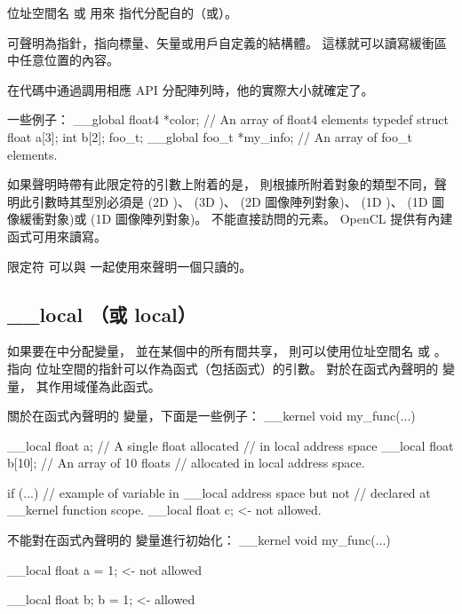位址空間名  或  用來
指代分配自的（或）。

 可聲明為指針，指向標量、矢量或用戶自定義的結構體。
這樣就可以讀寫緩衝區中任意位置的內容。

在代碼中通過調用相應 API 分配陣列時，他的實際大小就確定了。

一些例子：
\startclc
__global float4	*color;		// An array of float4 elements
typedef struct {
	float	a[3];
	int	b[2];
} foo_t;
__global foo_t	*my_info;	// An array of foo_t elements.
\stopclc

如果聲明時帶有此限定符的引數上附着的是，
則根據所附着對象的類型不同，聲明此引數時其型別必須是
  (2D )、  (3D )、
  (2D 圖像陣列對象)、  (1D )、
  (1D 圖像緩衝對象)或  (1D 圖像陣列對象)。
不能直接訪問的元素。 OpenCL 提供有內建函式可用來讀寫。

限定符  可以與  一起使用來聲明一個只讀的。

\subsection{__local （或 local）}

如果要在中分配變量，
並在某個中的所有間共享，
則可以使用位址空間名  或 。
指向  位址空間的指針可以作為函式（包括函式）的引數。
對於在函式內聲明的  變量，
其作用域僅為此函式。

關於在函式內聲明的  變量，下面是一些例子：
\startclc
__kernel void my_func(...)
{
	__local float	a;	// A single float allocated
				// in local address space
	__local float	b[10];	// An array of 10 floats
				// allocated in local address space.

	if (...)
	{
		// example of variable in __local address space but not
		// declared at __kernel function scope.
		__local float	c;	<- not allowed.
	}
}
\stopclc

不能對在函式內聲明的  變量進行初始化：
\startclc
__kernel void my_func(...)
{
	__local float	a = 1;	<- not allowed

	__local float	b;
	b = 1;			<- allowed
}
\stopclc

